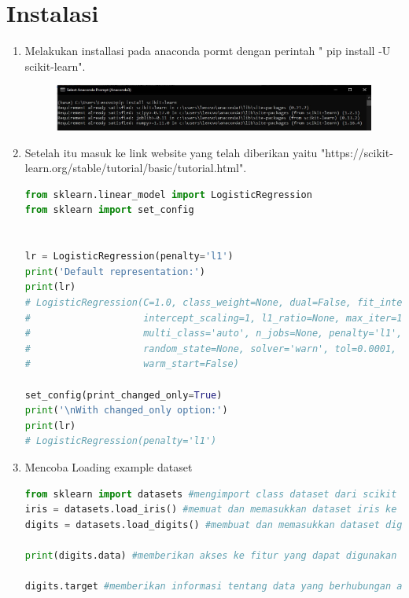 \section{Instalasi}
\begin{enumerate}
\item Melakukan installasi pada anaconda pormt dengan perintah " pip install -U scikit-learn".
    \begin{figure}[!htbp]
    \centering
    \includegraphics[scale=0.4]{figures/instalasi.jpeg}
    \end{figure}
    \newpage
    \item Setelah itu masuk ke link website yang telah diberikan yaitu "https://scikit-learn.org/stable/tutorial/basic/tutorial.html".
    \begin{lstlisting}[language=Python]
from sklearn.linear_model import LogisticRegression
from sklearn import set_config


lr = LogisticRegression(penalty='l1')
print('Default representation:')
print(lr)
# LogisticRegression(C=1.0, class_weight=None, dual=False, fit_intercept=True,
#                    intercept_scaling=1, l1_ratio=None, max_iter=100,
#                    multi_class='auto', n_jobs=None, penalty='l1',
#                    random_state=None, solver='warn', tol=0.0001, verbose=0,
#                    warm_start=False)

set_config(print_changed_only=True)
print('\nWith changed_only option:')
print(lr)
# LogisticRegression(penalty='l1')
\end{lstlisting}
\item Mencoba Loading example dataset
 \begin{lstlisting}[language=Python]
from sklearn import datasets #mengimport class dataset dari scikit learn library
iris = datasets.load_iris() #memuat dan memasukkan dataset iris ke variabel bernama iris
digits = datasets.load_digits() #membuat dan memasukkan dataset digits ke variabel digits

print(digits.data) #memberikan akses ke fitur yang dapat digunakan untuk mengklasifikasikan  sampel digit dan menampilkan diconsole

digits.target #memberikan informasi tentang data yang berhubungan atau juga dapat dijadikan sebagai label


\end{lstlisting}
\end{enumerate}
